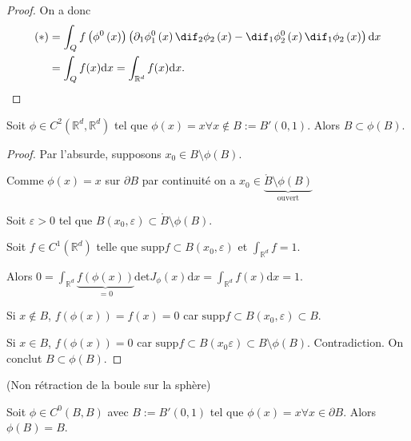 \begin{proof}
	On a donc 
	\begin{align*}
		\left( * \right) &= \int_Q f\left( \phi^0 \left(x  \right) \right) \left( \partial_1 \phi_{1}^0\left( x \right) \dif_2 \phi_2 \left( x \right) - \dif_1 \phi^0_2\left(x  \right) \dif_1 \phi_2 \left( x \right) \right) \mathrm{d} x\\
		&= \int_Q f(x) \mathrm{d} x = \int_{\mathbb{R}^d}f(x) \dd x 
	.\end{align*}
\end{proof} 
\begin{corollaire}
	Soit $\phi \in C^2 \left( \mathbb{R}^d, \mathbb{R}^d \right) $ tel que $\phi\left( x \right) =x \forall x \not\in B := B'\left( 0,1 \right) $. Alors $B \subset \phi\left( B \right) $.
\end{corollaire}

\begin{proof}
		Par l'absurde, supposons $x_0 \in B \setminus \phi\left( B \right) $.

Comme $ \phi \left( x \right) =x$ sur $ \partial B$ par continuité on a $x_0 \in \underbrace{\mathring{B} \setminus \phi(B)}_{\text{ouvert}}$

Soit $\varepsilon>0$ tel que $B\left( x_0, \varepsilon \right) \subset \mathring{B}\setminus \phi\left( B \right) .$

Soit $f \in C^1\left( \mathbb{R}^d  \right) $ telle que $\text{supp} f \subset B\left( x_0, \varepsilon \right) $ et $\int_{\mathbb{R}^d }f =1$.

Alors $0=\int_{\mathbb{R}^d } \underbrace{ f\left( \phi\left( x \right)  \right) }_{=0} \text{det} J_{\phi}\left( x  \right) \text{d} x = \int_{\mathbb{R}^d } f\left( x \right) \text{d} x = 1$.

Si $x \not\in B$, $f\left( \phi\left( x \right)  \right) = f(x) = 0$ car  $\text{supp} f \subset B\left( x_0, \varepsilon \right) \subset B$.

Si $x \in B$, $f\left( \phi\left( x \right)  \right) =0$ car $\text{supp} f \subset  B\left( x_0 \varepsilon \right) \subset B \setminus \phi\left( B \right) $. Contradiction. On conclut $B \subset  \phi\left( B \right) .$
\end{proof}
\begin{corollaire}
	(Non rétraction de la boule sur la sphère)

	Soit $\phi \in C^0\left(B,B  \right) $ avec $B := B'\left( 0,1 \right) $ tel que $\phi\left( x \right) =x \forall x \in  \partial B$. Alors $ \phi\left( B \right) =B$.
\end{corollaire}
